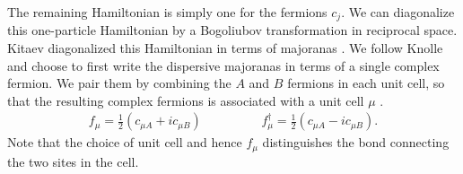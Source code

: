 \documentclass[aps,pra,preprint,groupedaddress]{revtex4-1}
\newcommand{\1}{\mathds{1}}
\begin{document}
The remaining Hamiltonian is simply one for the fermions $c_j$. We can diagonalize this one-particle Hamiltonian by a Bogoliubov transformation in reciprocal space. %
Kitaev diagonalized this Hamiltonian in terms of majoranas \cite{Kitaev}. We follow Knolle~\cite{Knolle} and choose to first write the dispersive majoranas in terms of a single complex fermion. We pair them by combining the $A$ and $B$ fermions in each unit cell, so that the resulting complex fermions is associated with a unit cell $\mu$ \cite{Knolle}. 
\begin{align}
f_\mu = \frac{1}{2} \left( c_{\mu A} + i c_{\mu B} \right) \hspace{2cm}
f_\mu^\dagger = \frac{1}{2} \left( c_{\mu A} - i c_{\mu B} \right).
\end{align}
Note that the choice of unit cell and hence $f_\mu$ distinguishes the bond connecting the two sites in the cell. %
\end{document}
